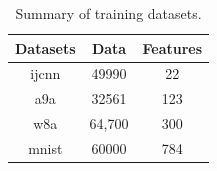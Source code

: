 \begin{table}[htbp]
\begin{center}
\caption{Summary of training datasets.}
\begin{tabular}{ c|c|c } 
 \hline
 Datasets &  Data & Features \\ 
 \hline
  ijcnn & 49990 & 22 \\
  a9a & 32561 & 123 \\ 
 w8a & 64,700  & 300 \\ 
 mnist & 60000 & 784 \\
 \hline
\end{tabular}
\label{metadata}
\end{center}
\end{table}

